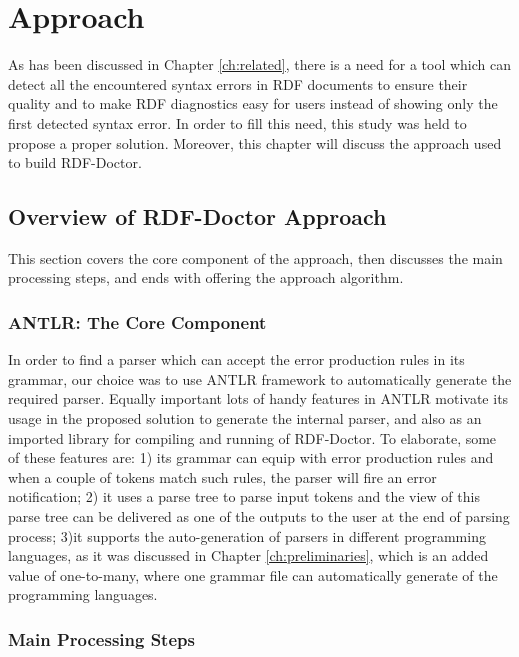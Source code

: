 \chapter{Approach}
\label{ch:approach}
As has been discussed in Chapter \ref{ch:related}, there is a need for a tool which can detect all the encountered syntax errors in RDF documents to ensure their quality and to make RDF diagnostics easy for users instead of showing only the first detected syntax error. In order to fill this need, this study was held to propose a proper solution. Moreover, this chapter will discuss the approach used to build RDF-Doctor.


\section{Overview of RDF-Doctor Approach}
This section covers the core component of the approach, then discusses the main processing steps, and ends with offering the approach algorithm. 
\subsection{ANTLR: The Core Component}
In order to find a parser which can accept the error production rules in its grammar, our choice was to use ANTLR framework to automatically generate the required parser. Equally important lots of handy features in ANTLR motivate its usage in the proposed solution to generate the internal parser, and also as an imported library for compiling and  running  of RDF-Doctor. To elaborate, some of these features are: 1) its grammar can equip with error production rules and when a couple of tokens match such rules, the parser will fire an error notification; 2) it uses a parse tree to parse input tokens and the view of this parse tree can be delivered as one of the outputs to the user at the end of parsing process; 3)it supports the auto-generation of parsers in different programming languages, as it was discussed in Chapter \ref{ch:preliminaries}, which is an added value  of one-to-many, where one grammar file can automatically generate of the programming languages.

\subsection{Main Processing Steps}

